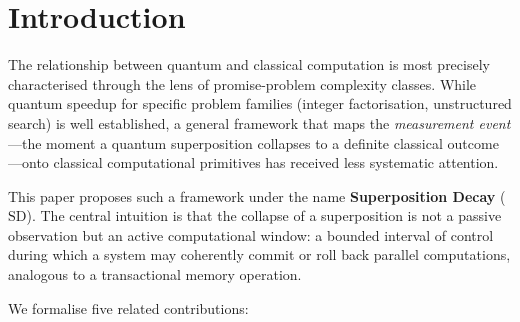 \documentclass[12pt, a4paper]{article}
\theoremstyle{plain}
\theoremstyle{definition}
\theoremstyle{remark}
\newcommand{\SD}{\ensuremath{\mathrm{SD}}}   %
\begin{document}
\tableofcontents
\newpage

\section{Introduction}
\label{sec:intro}

The relationship between quantum and classical computation is most precisely
characterised through the lens of promise-problem complexity classes.
While quantum speedup for specific problem families (integer factorisation,
unstructured search) is well established, a general framework that maps the
\emph{measurement event}---the moment a quantum superposition collapses to a
definite classical outcome---onto classical computational primitives has
received less systematic attention.

This paper proposes such a framework under the name \textbf{Superposition
Decay} (\SD).  The central intuition is that the collapse of a superposition
is not a passive observation but an active computational window: a bounded
interval of control during which a system may coherently commit or roll back
parallel computations, analogous to a transactional memory operation.

We formalise five related contributions:
\end{document}
